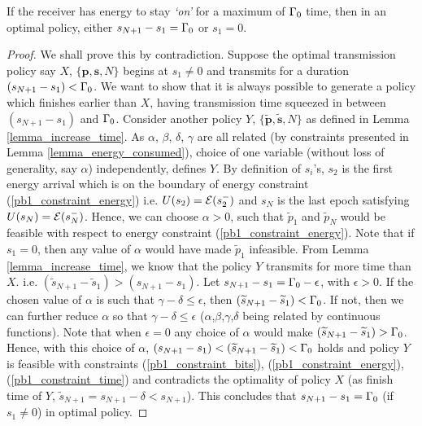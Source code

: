 \begin{lemma}
If the receiver has energy to stay \textit{`on'} for a maximum of $\Gamma_0$ time, then in an optimal policy, either $s_{N+1} - s_1 = \Gamma_0$ or $s_1 = 0$. 
\label{transmission_duration}
\end{lemma}
\begin{proof}
We shall prove this by contradiction. Suppose the optimal transmission policy say $X$, $\{\bm{p},\bm{s},N\}$ begins at $s_1\neq 0$ and transmits for a duration $(s_{N+1}-s_1)< \Gamma_0$. We want to show that it is always possible to generate a policy which finishes earlier than $X$, having transmission time squeezed in between $(s_{N+1}-s_1)$ and $\Gamma_0$. Consider another policy $Y$, $\{\bm{\widetilde{p}},\bm{\widetilde{s}},N\}$ as defined in Lemma \ref{lemma_increase_time}. As $\alpha$, $\beta$, $\delta$, $\gamma$ are all related (by constraints presented in Lemma \ref{lemma_energy_consumed}), choice of one variable (without loss of generality, say $\alpha$) independently, defines $Y$. By definition of $s_i$'s, $s_{2}$ is the first energy arrival which is on the boundary of energy constraint (\ref{pb1_constraint_energy}) i.e. $U(s_2)=\mathcal{E}(s_2^-)$ and $s_{N}$ is the last epoch satisfying $U(s_N)=\mathcal{E}(s_N^-)$. Hence, we can choose $\alpha>0$, such that $\tilde{p}_1$ and $\tilde{p}_N$ would be feasible with respect to energy constraint (\ref{pb1_constraint_energy}). Note that if $s_1=0$, then any value of $\alpha$ would have made $\widetilde{p}_1$ infeasible. From Lemma \ref{lemma_increase_time}, we know that the policy $Y$ transmits for more time than $X$. i.e. $(\tilde{s}_{N+1}-\tilde{s}_1) > (s_{N+1} - s_{1})$. Let $s_{N+1}-s_1=\Gamma_0-\epsilon$, with $\epsilon >0$. If the chosen value of $\alpha$ is such that $\gamma -\delta\le\epsilon$, then $\left( \widetilde{s}_{N+1}-\widetilde{s}_1\right)<\Gamma_0$. If not, then we can further reduce $\alpha$ so that $\gamma -\delta\le\epsilon$ ($\alpha$,$\beta$,$\gamma$,$\delta$ being related by continuous functions).  Note that when $\epsilon=0$ any choice of $\alpha$ would make $\left( \widetilde{s}_{N+1}-\widetilde{s}_1\right)>\Gamma_0$. Hence, with this choice of $\alpha$, $(s_{N+1}-s_1)<\left( \widetilde{s}_{N+1}-\widetilde{s}_1\right)<\Gamma_0$ holds and  policy $Y$ is feasible with constraints  (\ref{pb1_constraint_bits}), (\ref{pb1_constraint_energy}), (\ref{pb1_constraint_time}) and contradicts the optimality of policy $X$ (as finish time of $Y$, $\widetilde{s}_{N+1}=s_{N+1}-\delta <s_{N+1}$). This concludes that $s_{N+1}-s_1=\Gamma_0$ (if $s_1\neq 0$) in optimal policy.
\end{proof}